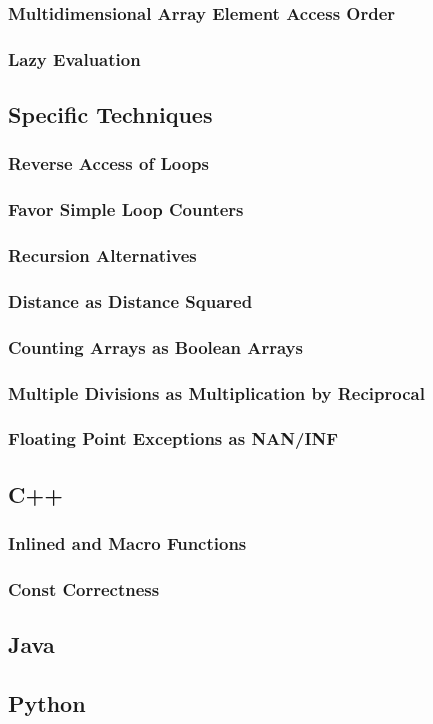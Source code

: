 \subsubsection{Multidimensional Array Element Access Order}

\subsubsection{Lazy Evaluation}

\subsection{Specific Techniques}

\subsubsection{Reverse Access of Loops}

\subsubsection{Favor Simple Loop Counters}

\subsubsection{Recursion Alternatives}

\subsubsection{Distance as Distance Squared}

\subsubsection{Counting Arrays as Boolean Arrays}

\subsubsection{Multiple Divisions as Multiplication by Reciprocal}

\subsubsection{Floating Point Exceptions as NAN/INF}

\subsection{C++}

\subsubsection{Inlined and Macro Functions}

\subsubsection{Const Correctness}

\subsection{Java}

\subsection{Python}
